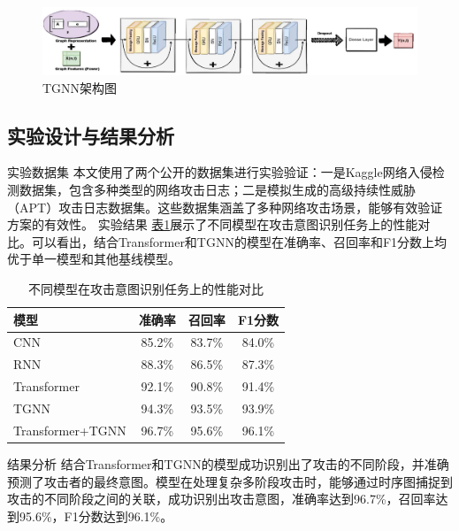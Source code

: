 \documentclass{article} %
\begin{document}
	\begin{figure}
		\begin{center}
			\includegraphics[width=0.6\textheight]{TGNN.png}
			\caption{TGNN架构图}
			\label{tgnn}
		\end{center}
	\end{figure}
	
	\subsection{实验设计与结果分析}
	
	实验数据集
	本文使用了两个公开的数据集进行实验验证：一是Kaggle网络入侵检测数据集，包含多种类型的网络攻击日志；二是模拟生成的高级持续性威胁（APT）攻击日志数据集。这些数据集涵盖了多种网络攻击场景，能够有效验证方案的有效性。
	实验结果
	\hyperref[model-performance]{表1}展示了不同模型在攻击意图识别任务上的性能对比。可以看出，结合Transformer和TGNN的模型在准确率、召回率和F1分数上均优于单一模型和其他基线模型\citep{Krizhevsky2012}\citep{Li2020}。
	\begin{table}[t]
		\caption{不同模型在攻击意图识别任务上的性能对比}
		\label{model-performance}
		\begin{center}
			\begin{tabular}{lccc}
				\hline
				\multicolumn{1}{l}{\bf 模型} & \multicolumn{1}{c}{\bf 准确率} & \multicolumn{1}{c}{\bf 召回率} & \multicolumn{1}{c}{\bf F1分数} \\ \hline
				CNN & 85.2\% & 83.7\% & 84.0\% \\
				RNN & 88.3\% & 86.5\% & 87.3\% \\
				Transformer & 92.1\% & 90.8\% & 91.4\% \\
				TGNN & 94.3\% & 93.5\% & 93.9\% \\
				Transformer+TGNN & 96.7\% & 95.6\% & 96.1\% \\
				\hline
			\end{tabular}
		\end{center}
	\end{table}
	结果分析
	结合Transformer和TGNN的模型成功识别出了攻击的不同阶段，并准确预测了攻击者的最终意图。模型在处理复杂多阶段攻击时，能够通过时序图捕捉到攻击的不同阶段之间的关联，成功识别出攻击意图，准确率达到96.7\%，召回率达到95.6\%，F1分数达到96.1\%\citep{Vaswani2017}\citep{Provoost2019}。
	
\end{document}
